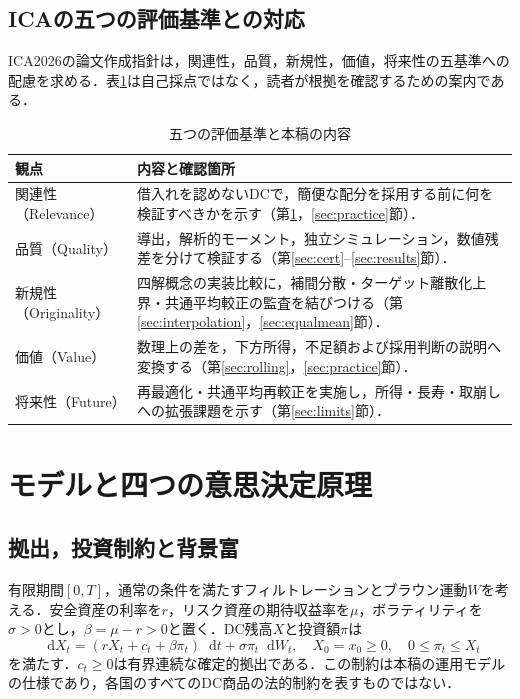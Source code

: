 \documentclass[10pt,a4paper]{article}
\numberwithin{equation}{section}
\numberwithin{table}{section}
\numberwithin{figure}{section}
\theoremstyle{plain}
\theoremstyle{definition}
\newcommand{\dd}{\mathop{}\!\mathrm{d}}
\begin{document}
\subsection{ICAの五つの評価基準との対応}
ICA2026の論文作成指針は，関連性，品質，新規性，価値，将来性の五基準への配慮を求める\citep{ICA2026Guidance,ICA2026Call}．表\ref{tab:ica}は自己採点ではなく，読者が根拠を確認するための案内である．
\begin{table}[htbp]\centering\small
\caption{五つの評価基準と本稿の内容}\label{tab:ica}
\begin{tabularx}{\textwidth}{>{\raggedright\arraybackslash}p{31mm}X}
\toprule 観点 & 内容と確認箇所 \\ \midrule
関連性（Relevance） & 借入れを認めないDCで，簡便な配分を採用する前に何を検証すべきかを示す（第\ref{sec:model}，\ref{sec:practice}節）．\\
品質（Quality） & 導出，解析的モーメント，独立シミュレーション，数値残差を分けて検証する（第\ref{sec:cert}--\ref{sec:results}節）．\\
新規性（Originality） & 四解概念の実装比較に，補間分散・ターゲット離散化上界・共通平均較正の監査を結びつける（第\ref{sec:interpolation}，\ref{sec:equalmean}節）．\\
価値（Value） & 数理上の差を，下方所得，不足額および採用判断の説明へ変換する（第\ref{sec:rolling}，\ref{sec:practice}節）．\\
将来性（Future） & 再最適化・共通平均再較正を実施し，所得・長寿・取崩しへの拡張課題を示す（第\ref{sec:limits}節）．\\
\bottomrule\end{tabularx}\end{table}

\section{モデルと四つの意思決定原理}
\label{sec:model}
\subsection{拠出，投資制約と背景富}
有限期間$[0,T]$，通常の条件を満たすフィルトレーションとブラウン運動$W$を考える．安全資産の利率を$r$，リスク資産の期待収益率を$\mu$，ボラティリティを$\sigma>0$とし，$\beta=\mu-r>0$と置く．DC残高$X$と投資額$\pi$は
\begin{equation}
\dd X_t=(rX_t+c_t+\beta\pi_t)\dd t+\sigma\pi_t\dd W_t,
\quad X_0=x_0\geq0,\quad 0\leq\pi_t\leq X_t
\label{eq:state}
\end{equation}
を満たす．$c_t\geq0$は有界連続な確定的拠出である．この制約は本稿の運用モデルの仕様であり，各国のすべてのDC商品の法的制約を表すものではない．
\end{document}

